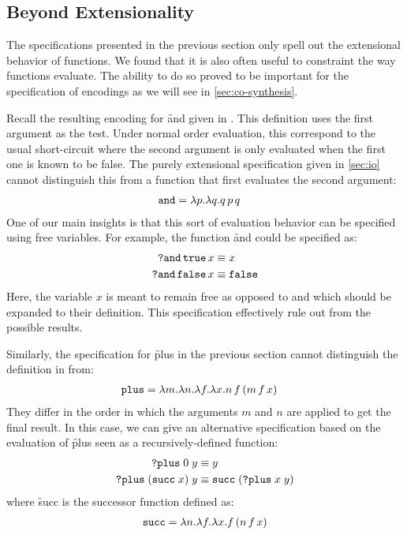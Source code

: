 \subsection{Beyond Extensionality}
%
The specifications presented in the previous section only
spell out the extensional behavior of functions.
%
We found that it is also often useful to constraint the way
functions evaluate.
%
The ability to do so proved to be important for the
specification of encodings as we will see in
\cref{sec:co-synthesis}.

Recall the resulting encoding for \f{and} given in
.
%
This definition uses the first argument as the test.
%
Under normal order evaluation, this correspond to the usual
short-circuit where the second argument is only
evaluated when the first one is known to be false.
%
The purely extensional specification given in \cref{sec:io}
cannot distinguish this from a function that first
evaluates the second argument:
%
\begin{align}
  \label{eq:and-def2}
  \texttt{and} &= \lambda p. \lambda q. q\,p\,q
\end{align}
%
One of our main insights is that this sort of evaluation
behavior can be specified using free variables.
%
For example, the function \f{and} could be specified as:
%
\begin{align*}
  \texttt{?and}\,\texttt{true}\,x &\equiv x \\
  \texttt{?and}\,\texttt{false}\,x &\equiv \texttt{false} \\
\end{align*}
%
Here, the variable $x$ is meant to remain free as opposed to
\true and \false which should be expanded to their
definition.
%
This specification effectively rule out
 from the possible results.

Similarly, the specification for \f{plus} in the previous
section cannot distinguish the definition in
 from:
%
\begin{align}
  \label{eq:plus-def2}
  \texttt{plus} &= \lambda m.\lambda n.\lambda f.\lambda x.n\,f\,(m\,f\,x)
\end{align}
%
They differ in the order in which the arguments $m$ and $n$
are applied to get the final result.
%
In this case, we can give an alternative specification based
on the evaluation of \f{plus} seen as a recursively-defined
function:
%
\begin{align*}
  \texttt{?plus}\;0\;y &\equiv y \\
  \texttt{?plus}\;(\texttt{succ}\;x)\;y &\equiv \texttt{succ}\;(\texttt{?plus}\;x\;y)
\end{align*}
%
where \f{succ} is the successor function defined as:
%
\begin{align*}
  \texttt{succ} = \lambda n. \lambda f. \lambda x. f\,(n\,f\,x)
\end{align*}

